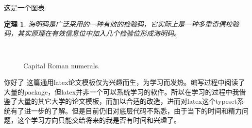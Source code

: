 \documentclass[a4paper,AutoFakeBold,12pt]{ctexbook}
\newtheorem{theorem}{\hspace{2em}定理}[section]
\begin{document}
这是一个图表\\
\begin{theorem}
海明码是广泛采用的一种有效的检验码，它实际上是一种多重奇偶校验码，其实原理在有效信息位中加入几个检验位形成海明码。
\end{theorem}

\begin{figure}[tbp]
	\centering
	\quad
	\\	
	\caption{Capital Roman numerals.}
\end{figure}
\newpage
你好了
\newpage
这篇通用latex论文模板仅为兴趣而生，为学习而发热。编写过程中阅读了大量的package，但latex并非一个可以系统学习的软件。所以在学习的过程中我借鉴了大量的其它大学的论文模板，而加以合适的改造，进而对latex这个typeset系统有了进一步的了解。但是目前仍旧对底层代码不熟悉，由于当下的时间和精力问题，这个学习方向只能交给将来的我是否有时间和兴趣了。
\end{document}
